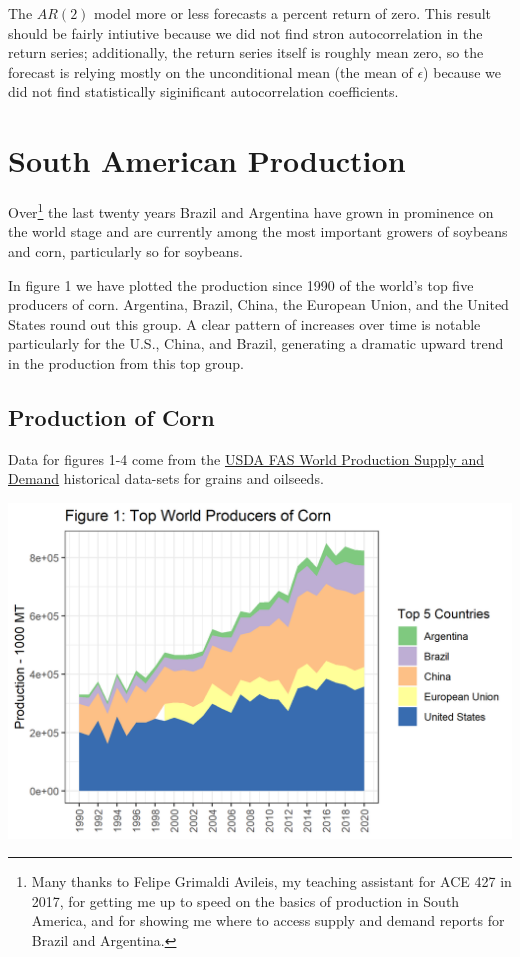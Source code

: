 \documentclass[
]{book}
\begin{document}
The \(AR(2)\) model more or less forecasts a percent return of zero. This result should be fairly intiutive because we did not find stron autocorrelation in the return series; additionally, the return series itself is roughly mean zero, so the forecast is relying mostly on the unconditional mean (the mean of \(\epsilon\)) because we did not find statistically siginificant autocorrelation coefficients.

\hypertarget{south-american-production}{%
\chapter{South American Production}\label{south-american-production}}

Over\footnote{Many thanks to Felipe Grimaldi Avileis, my teaching assistant for ACE 427 in 2017, for getting me up to speed on the basics of production in South America, and for showing me where to access supply and demand reports for Brazil and Argentina.} the last twenty years Brazil and Argentina have grown in prominence on the world stage and are currently among the most important growers of soybeans and corn, particularly so for soybeans.

In figure 1 we have plotted the production since 1990 of the world's top five producers of corn. Argentina, Brazil, China, the European Union, and the United States round out this group. A clear pattern of increases over time is notable particularly for the U.S., China, and Brazil, generating a dramatic upward trend in the production from this top group.

\hypertarget{production-of-corn}{%
\section{Production of Corn}\label{production-of-corn}}

Data for figures 1-4 come from the \href{https://apps.fas.usda.gov/psdonline/app/index.html\#/app/downloads}{USDA FAS World Production Supply and Demand} historical data-sets for grains and oilseeds.

\includegraphics{assets/SouthAmericanProduction_TopProdCorn.png}
\end{document}
